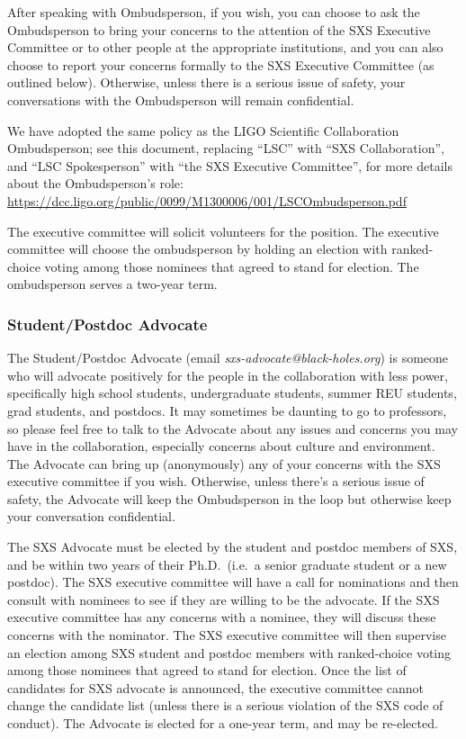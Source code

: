 After speaking with Ombudsperson, if you wish, you can choose to ask
the Ombudsperson to bring your concerns to the attention of the SXS
Executive Committee or to other people at the appropriate
institutions, and you can also choose to report your concerns formally
to the SXS Executive Committee (as outlined below). Otherwise, unless
there is a serious issue of safety, your conversations with the
Ombudsperson will remain confidential.

We have adopted the same policy as the LIGO Scientific Collaboration
Ombudsperson; see this document, replacing “LSC” with “SXS
Collaboration”, and “LSC Spokesperson” with “the SXS Executive
Committee”, for more details about the Ombudsperson’s role:
\url{https://dcc.ligo.org/public/0099/M1300006/001/LSCOmbudsperson.pdf}

The executive committee will solicit volunteers for the
position.  The executive committee will choose the ombudsperson by
holding an election with ranked-choice voting among those nominees
that agreed to stand for election.  The ombudsperson serves a
two-year term.

\subsubsection{Student/Postdoc Advocate}
\label{sec:advocate}
The Student/Postdoc Advocate (email
\emph{sxs-advocate@black-holes.org}) is someone who will advocate
positively for the people in the collaboration with less power,
specifically high school students, undergraduate students, summer REU
students, grad students, and postdocs. It may sometimes be daunting to
go to professors, so please feel free to talk to the Advocate about
any issues and concerns you may have in the collaboration, especially
concerns about culture and environment. The Advocate can bring up
(anonymously) any of your concerns with the SXS executive committee if
you wish. Otherwise, unless there’s a serious issue of safety, the
Advocate will keep the Ombudsperson in the loop but otherwise keep
your conversation confidential.


The SXS Advocate must be elected by the student and postdoc members of
SXS, and be within two years of their Ph.D.~(i.e.~a senior graduate
student or a new postdoc).  The SXS executive committee will have a
call for nominations and then consult with nominees to see if they are
willing to be the advocate.  If the SXS executive committee has any
concerns with a nominee, they will discuss these concerns with the
nominator.  The SXS executive committee will then supervise an
election among SXS student and postdoc members with ranked-choice
voting among those nominees that agreed to stand for election.  Once
the list of candidates for SXS advocate is announced, the executive
committee cannot change the candidate list (unless there is a serious
violation of the SXS code of conduct).  The Advocate is elected for a
one-year term, and may be re-elected.

